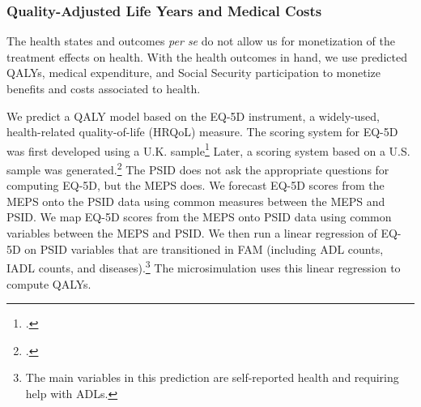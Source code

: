 \subsubsection{Quality-Adjusted Life Years and Medical Costs} \label{section:qalys}

\noindent The health states and outcomes \textit{per se} do not allow us for monetization of the treatment effects on health. With the health outcomes in hand, we use predicted QALYs, medical expenditure, and Social Security participation to monetize benefits and costs associated to health.

We predict a QALY model based on the EQ-5D instrument, a widely-used, health-related quality-of-life (HRQoL) measure. The scoring system for EQ-5D was first developed using a U.K. sample\footnote{\citet{Dolan_1997_Modeling_MC}.} Later, a scoring system based on a U.S. sample was generated.\footnote{\citet{Shaw_etal_2005_EQ5D_MC}.} The PSID does not ask the appropriate questions for computing EQ-5D, but the MEPS does. We forecast EQ-5D scores from the MEPS onto the PSID data using common measures between the MEPS and PSID. We map EQ-5D scores from the MEPS onto PSID data using common variables between the MEPS and PSID. We then run a linear regression of EQ-5D on PSID variables that are transitioned in FAM (including ADL counts, IADL counts, and diseases).\footnote{The main variables in this prediction are self-reported health and requiring help with ADLs.} The microsimulation uses this linear regression to compute QALYs.

